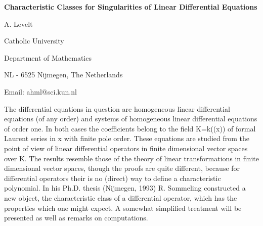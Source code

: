 

\centerline{\bf Characteristic Classes for Singularities of Linear Differential
Equations}

\vskip 0.3cm

\centerline{A. Levelt}
\centerline{Catholic University}
\centerline{Department of Mathematics}
\centerline{NL - 6525 Nijmegen, The Netherlands}
\centerline{Email: ahml@sci.kun.nl}

\vskip 0.3cm

The differential equations in question are homogeneous linear differential
equations (of any order) and systems of homogeneous linear differential
equations of order one. In both cases the coefficients belong to the field
K=k((x)) of formal Laurent series in x with finite pole order. These equations
are studied from the point of view of linear differential operators in finite
dimensional vector spaces over K. The results resemble those of the theory
of linear transformations in finite dimensional vector spaces, though the
proofs are quite different, because for differential operators their is no
(direct) way to define a characteristic polynomial. In his Ph.D. thesis
(Nijmegen, 1993) R. Sommeling constructed a new object, the characteristic
class of a differential operator, which has the properties which one might
expect. A somewhat simplified treatment will be presented as well as
remarks on computations.


